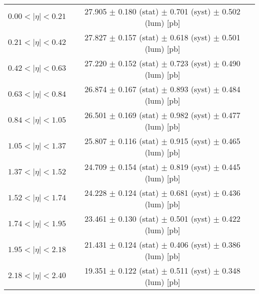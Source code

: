 \begin{tabular}{lc}
\hline
$0.00 < |\eta| <0.21$          & 27.905 $\pm$ 0.180 (stat) $\pm$ 0.701 (syst) $\pm$ 0.502 (lum) [pb]  \\
$0.21 < |\eta| <0.42$          & 27.827 $\pm$ 0.157 (stat) $\pm$ 0.618 (syst) $\pm$ 0.501 (lum) [pb]  \\
$0.42 < |\eta| <0.63$          & 27.220 $\pm$ 0.152 (stat) $\pm$ 0.723 (syst) $\pm$ 0.490 (lum) [pb]  \\
$0.63 < |\eta| <0.84$          & 26.874 $\pm$ 0.167 (stat) $\pm$ 0.893 (syst) $\pm$ 0.484 (lum) [pb]  \\
$0.84 < |\eta| <1.05$          & 26.501 $\pm$ 0.169 (stat) $\pm$ 0.982 (syst) $\pm$ 0.477 (lum) [pb]  \\
$1.05 < |\eta| <1.37$          & 25.807 $\pm$ 0.116 (stat) $\pm$ 0.915 (syst) $\pm$ 0.465 (lum) [pb]  \\
$1.37 < |\eta| <1.52$          & 24.709 $\pm$ 0.154 (stat) $\pm$ 0.819 (syst) $\pm$ 0.445 (lum) [pb]  \\
$1.52 < |\eta| <1.74$          & 24.228 $\pm$ 0.124 (stat) $\pm$ 0.681 (syst) $\pm$ 0.436 (lum) [pb]  \\
$1.74 < |\eta| <1.95$          & 23.461 $\pm$ 0.130 (stat) $\pm$ 0.501 (syst) $\pm$ 0.422 (lum) [pb]  \\
$1.95 < |\eta| <2.18$          & 21.431 $\pm$ 0.124 (stat) $\pm$ 0.406 (syst) $\pm$ 0.386 (lum) [pb]  \\
$2.18 < |\eta| <2.40$          & 19.351 $\pm$ 0.122 (stat) $\pm$ 0.511 (syst) $\pm$ 0.348 (lum) [pb]  \\
\hline
\end{tabular}
